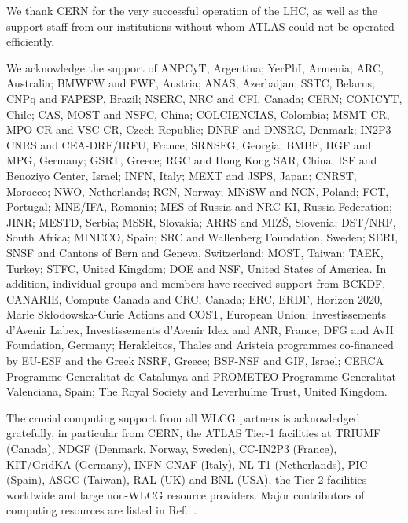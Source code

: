 

We thank CERN for the very successful operation of the LHC, as well as the
support staff from our institutions without whom ATLAS could not be
operated efficiently.                                                                                                                                                                                                                                                                                                                                                                                                                                                                                                                                                                                                                                                                                                                        

We acknowledge the support of ANPCyT, Argentina; YerPhI, Armenia; ARC, Australia; BMWFW and FWF, Austria; ANAS, Azerbaijan; SSTC, Belarus; CNPq and FAPESP, Brazil; NSERC, NRC and CFI, Canada; CERN; CONICYT, Chile; CAS, MOST and NSFC, China; COLCIENCIAS, Colombia; MSMT CR, MPO CR and VSC CR, Czech Republic; DNRF and DNSRC, Denmark; IN2P3-CNRS and CEA-DRF/IRFU, France; SRNSFG, Georgia; BMBF, HGF and MPG, Germany; GSRT, Greece; RGC and Hong Kong SAR, China; ISF and Benoziyo Center, Israel; INFN, Italy; MEXT and JSPS, Japan; CNRST, Morocco; NWO, Netherlands; RCN, Norway; MNiSW and NCN, Poland; FCT, Portugal; MNE/IFA, Romania; MES of Russia and NRC KI, Russia Federation; JINR; MESTD, Serbia; MSSR, Slovakia; ARRS and MIZ\v{S}, Slovenia; DST/NRF, South Africa; MINECO, Spain; SRC and Wallenberg Foundation, Sweden; SERI, SNSF and Cantons of Bern and Geneva, Switzerland; MOST, Taiwan; TAEK, Turkey; STFC, United Kingdom; DOE and NSF, United States of America. In addition, individual groups and members have received support from BCKDF, CANARIE, Compute Canada and CRC, Canada; ERC, ERDF, Horizon 2020, Marie Sk{\l}odowska-Curie Actions and COST, European Union; Investissements d'Avenir Labex, Investissements d'Avenir Idex and ANR, France; DFG and AvH Foundation, Germany; Herakleitos, Thales and Aristeia programmes co-financed by EU-ESF and the Greek NSRF, Greece; BSF-NSF and GIF, Israel; CERCA Programme Generalitat de Catalunya and PROMETEO Programme Generalitat Valenciana, Spain; The Royal Society and Leverhulme Trust, United Kingdom.

The crucial computing support from all WLCG partners is acknowledged gratefully, in particular from CERN, the ATLAS Tier-1 facilities at TRIUMF (Canada), NDGF (Denmark, Norway, Sweden), CC-IN2P3 (France), KIT/GridKA (Germany), INFN-CNAF (Italy), NL-T1 (Netherlands), PIC (Spain), ASGC (Taiwan), RAL (UK) and BNL (USA), the Tier-2 facilities worldwide and large non-WLCG resource providers. Major contributors of computing resources are listed in Ref.~\cite{ATL-GEN-PUB-2016-002}.

